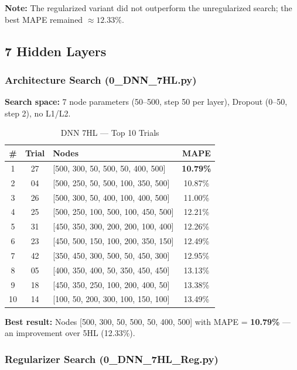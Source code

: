 \documentclass[11pt,a4paper]{article}
\begin{document}
\textbf{Note:} The regularized variant did not outperform the unregularized search; the best MAPE remained $\approx 12.33\%$.

\subsection{7 Hidden Layers}

\subsubsection*{Architecture Search (0\_DNN\_7HL.py)}

\textbf{Search space:} 7 node parameters (50--500, step 50 per layer), Dropout (0--50, step 2), no L1/L2.

\begin{table}[H]
\centering
\caption{DNN 7HL — Top 10 Trials}
\begin{tabular}{cclc}
\toprule
\textbf{\#} & \textbf{Trial} & \textbf{Nodes} & \textbf{MAPE} \\
\midrule
1 & 27 & [500, 300, 50, 500, 50, 400, 500] & \textbf{10.79\%} \\
2 & 04 & [500, 250, 50, 500, 100, 350, 500] & 10.87\% \\
3 & 26 & [500, 300, 50, 400, 100, 400, 500] & 11.00\% \\
4 & 25 & [500, 250, 100, 500, 100, 450, 500] & 12.21\% \\
5 & 31 & [450, 350, 300, 200, 200, 100, 400] & 12.26\% \\
6 & 23 & [450, 500, 150, 100, 200, 350, 150] & 12.49\% \\
7 & 42 & [350, 450, 300, 500, 50, 450, 300]  & 12.95\% \\
8 & 05 & [400, 350, 400, 50, 350, 450, 450]  & 13.13\% \\
9 & 18 & [450, 350, 250, 100, 200, 400, 50]  & 13.38\% \\
10 & 14 & [100, 50, 200, 300, 100, 150, 100]  & 13.49\% \\
\bottomrule
\end{tabular}
\end{table}

\textbf{Best result:} Nodes [500, 300, 50, 500, 50, 400, 500] with MAPE = \textbf{10.79\%} — an improvement over 5HL (12.33\%).

\subsubsection*{Regularizer Search (0\_DNN\_7HL\_Reg.py)}
\end{document}
